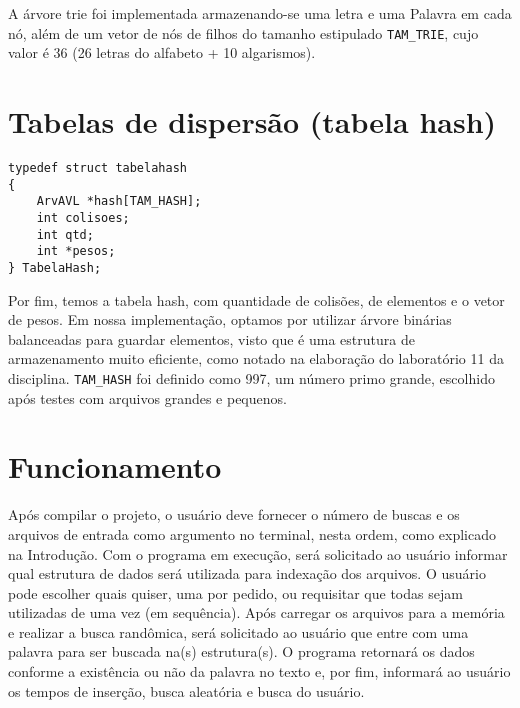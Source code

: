 A árvore trie foi implementada armazenando-se uma letra e uma Palavra em cada nó, além de um vetor de nós de filhos do tamanho estipulado \texttt{TAM\_TRIE}, cujo valor é 36 (26 letras do alfabeto + 10 algarismos).


\section{Tabelas de dispersão (tabela hash)}
\begin{lstlisting}
typedef struct tabelahash
{
    ArvAVL *hash[TAM_HASH];
    int colisoes;
    int qtd;
    int *pesos;
} TabelaHash;
\end{lstlisting}
Por fim, temos a tabela hash, com quantidade de colisões, de elementos e o vetor de pesos. Em nossa implementação, optamos por utilizar árvore binárias balanceadas para guardar elementos, visto que é uma estrutura de armazenamento muito eficiente, como notado na elaboração do laboratório 11 da disciplina. \texttt{TAM\_HASH} foi definido como 997, um número primo grande, escolhido após testes com arquivos grandes e pequenos.

\section{Funcionamento}
Após compilar o projeto, o usuário deve fornecer o número de buscas e os arquivos de entrada como argumento no terminal, nesta ordem, como explicado na Introdução. Com o programa em execução, será solicitado ao usuário informar qual estrutura de dados será utilizada para indexação dos arquivos. O usuário pode escolher quais quiser, uma por pedido, ou requisitar que todas sejam utilizadas de uma vez (em sequência). Após carregar os arquivos para a memória e realizar a busca randômica, será solicitado ao usuário que entre com uma palavra para ser buscada na(s) estrutura(s). O programa retornará os dados conforme a existência ou não da palavra no texto e, por fim, informará ao usuário os tempos de inserção, busca aleatória e busca do usuário.